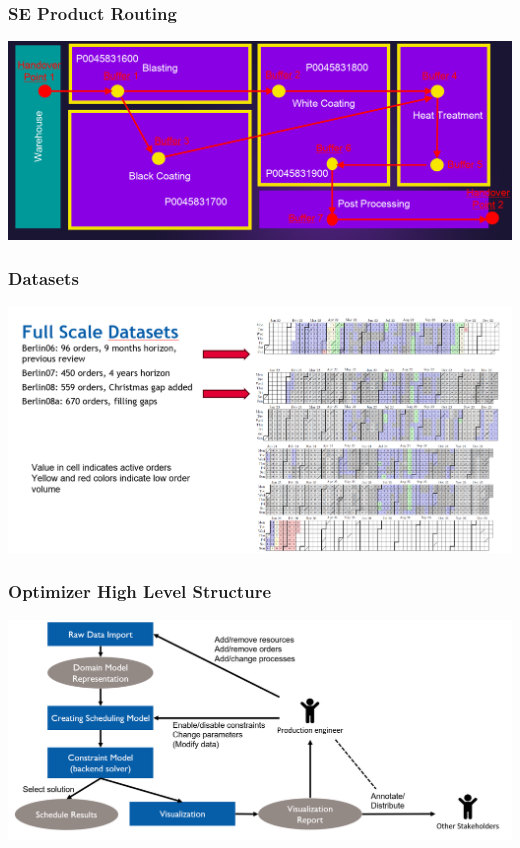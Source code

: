 \begin{frame}
\frametitle{SE Product Routing}
\includegraphics[width=\textwidth]{imagesse/assistantrouting}
\end{frame}

\begin{frame}
\frametitle{Datasets}
\includegraphics[width=\textwidth]{imagesse/assistantfullscaledatasets}
\end{frame}

\begin{frame}
\frametitle{Optimizer High Level Structure}
\includegraphics[width=.9\textwidth]{imagesse/overview}
\end{frame}

